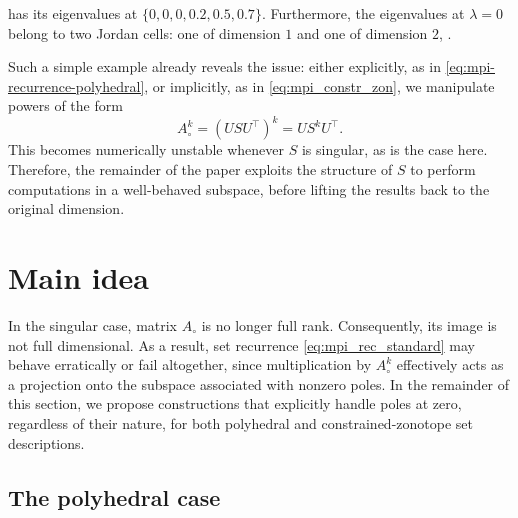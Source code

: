\documentclass[journal,twoside,web]{ieeecolor}
\begin{document}
has its eigenvalues at $\{0,0,0,0.2,0.5,0.7\}$. Furthermore, the eigenvalues at $\lambda=0$ belong to two Jordan cells: one of dimension $1$ and one of dimension $2$, \cite[Chapter 3]{horn2012matrix}.

Such a simple example already reveals the issue: either explicitly, as in \eqref{eq:mpi-recurrence-polyhedral}, or implicitly, as in \eqref{eq:mpi_constr_zon}, we manipulate powers of the form
\[
A_\circ^k = (USU^\top)^k = U S^k U^\top.
\]
This becomes numerically unstable whenever $S$ is singular, as is the case here. Therefore, the remainder of the paper exploits the structure of $S$ to perform computations in a well-behaved subspace, before lifting the results back to the original dimension.






\newpage


\section{Main idea}
\label{sec:main_idea}
In the singular case, matrix $A_\circ$ is no longer full rank. Consequently, its image is not full dimensional. As a result, set recurrence \eqref{eq:mpi_rec_standard} may behave erratically or fail altogether, since multiplication by $A_\circ^k$ effectively acts as a projection onto the subspace associated with nonzero poles. In the remainder of this section, we propose constructions that explicitly handle poles at zero, regardless of their nature, for both polyhedral and constrained-zonotope set descriptions.

\subsection{The polyhedral case}
\end{document}
